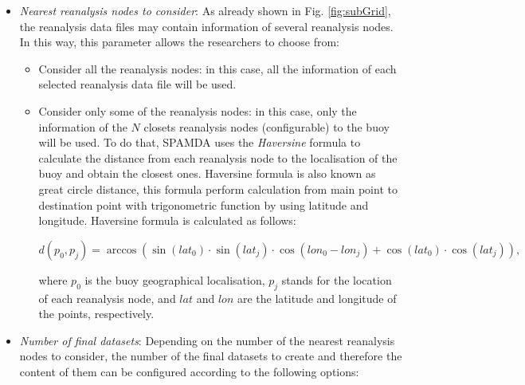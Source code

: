 \begin{onehalfspace}
\begin{itemize}
					\item \textit{Nearest reanalysis nodes to consider}: As already shown in Fig. \ref{fig:subGrid}, the reanalysis data files may contain information of several reanalysis nodes. In this way, this parameter allows the researchers to choose from:
					
						\begin{itemize}
						
							\item Consider all the reanalysis nodes: in this case, all the information of each selected reanalysis data file will be used.
							
							\item Consider only some of the reanalysis nodes: in this case, only the information of the $N$ closets reanalysis nodes (configurable) to the buoy will be used. To do that, SPAMDA uses the \textit{Haversine} formula \cite{Haversine_2009} to calculate the distance from each reanalysis node to the localisation of the buoy and obtain the closest ones. Haversine formula is also known as great circle distance, this formula perform calculation from main point to destination point with trigonometric function by using latitude and longitude. Haversine formula is calculated as follows:
							  \begin{linenomath*}
									\begin{equation}
										d(p_0,p_j)=\arccos(\sin(lat_0)\cdot \sin(lat_j)\cdot \cos(lon_0-lon_j) + \cos(lat_0) \cdot \cos(lat_j)),
										\label{eq:Haversine}
									\end{equation}
								\end{linenomath*}
							where $p_0$ is the buoy geographical localisation, $p_j$ stands for the location of each reanalysis node, and $lat$ and $lon$ are the latitude and longitude of the points, respectively.
							
						\end{itemize}
					
					\item \textit{Number of final datasets}: Depending on the number of the nearest reanalysis nodes to consider, the number of the final datasets to create and therefore the content of them can be configured according to the following options:

						\begin{itemize}
							

\end{itemize}
\end{itemize}
\end{onehalfspace}
